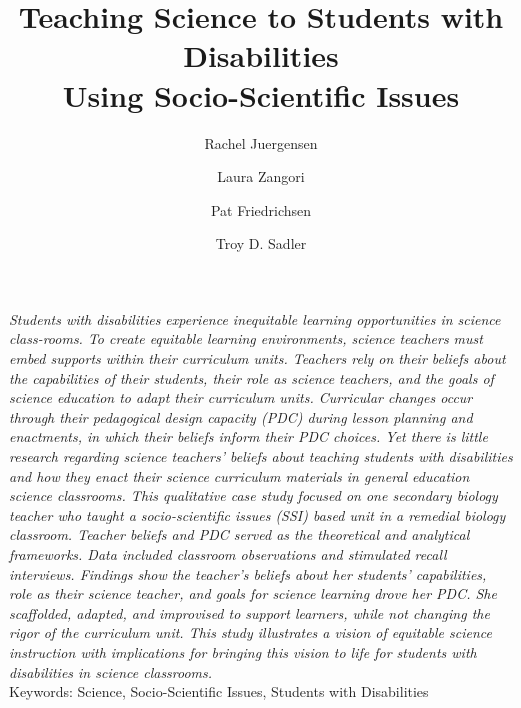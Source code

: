 \documentclass[11.5pt]{sig-alternate}
\makeatletter
\let\oldabstract\abstract
\let\oldendabstract\endabstract
\renewenvironment{abstract}
{\renewenvironment{quotation}%
               {\list{}{\addtolength{\leftmargin}{1em} %
                        \listparindent 1.5em%
                        \itemindent    \listparindent%
                        \rightmargin   \leftmargin%
                        \parsep        \z@ \@plus\p@}%
                \item\relax}%
               {\endlist}%
\oldabstract}
{\oldendabstract}
\makeatother
\begin{document}
\title{Teaching Science to Students with Disabilities \\Using Socio-Scientific Issues}

\author[1]{\large \color{blue} Rachel Juergensen}
\author[2]{\large \color{blue} Laura Zangori}
\author[2]{\large \color{blue} Pat Friedrichsen}
\author[3]{\large \color{blue} Troy D. Sadler}



\toappear{}

\maketitle
\begin{@twocolumnfalse} 
\begin{abstract}
\item 
\begin{large}
 \textit{Students with disabilities experience inequitable learning opportunities in science class-rooms. To create equitable learning environments, science teachers must embed supports within their curriculum units. Teachers rely on their beliefs about the capabilities of their students, their role as science teachers, and the goals of science education to adapt their curriculum units. Curricular changes occur through their pedagogical design capacity (PDC) during lesson planning and enactments, in which their beliefs inform their PDC choices. Yet there is little research regarding science teachers’ beliefs about teaching students with disabilities and how they enact their science curriculum materials in general education science classrooms. This qualitative case study focused on one secondary biology teacher who taught a socio-scientific issues (SSI) based unit in a remedial biology classroom. Teacher beliefs and PDC served as the theoretical and analytical frameworks. Data included classroom observations and stimulated recall interviews. Findings show the teacher’s beliefs about her students’ capabilities, role as their science teacher, and goals for science learning drove her PDC. She scaffolded, adapted, and improvised to support learners, while not changing the rigor of the curriculum unit. This study illustrates a vision of equitable science instruction with implications for bringing this vision to life for students with disabilities in science classrooms.}\\
 

   
     
     Keywords: Science, Socio-Scientific Issues, Students with Disabilities
 \end{large}     
\end{abstract}
\end{@twocolumnfalse}
\end{document}
